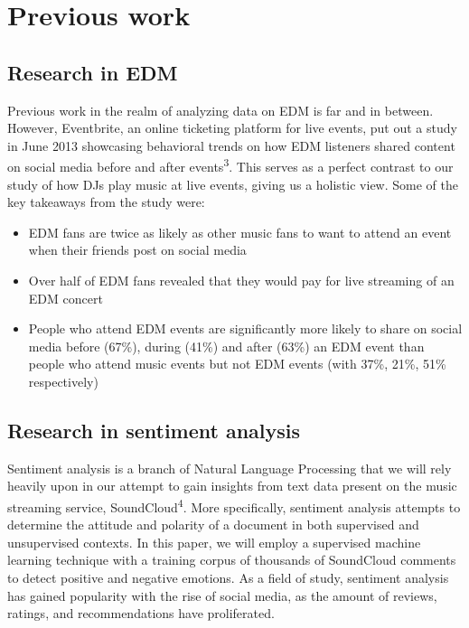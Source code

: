 \documentclass[12pt]{dalcsthesis}
\begin{document}
\chapter{Previous work}

\section{Research in EDM}

Previous work in the realm of analyzing data on EDM is far and in between. However, Eventbrite, an online ticketing platform for live events, put out a study in June 2013 showcasing behavioral trends on how EDM listeners shared content on social media before and after events\textsuperscript{3}. This serves as a perfect contrast to our study of how DJs play music at live events, giving us a holistic view. Some of the key takeaways from the study were:

\begin{itemize}
  \item EDM fans are twice as likely as other music fans to want to attend an event when their friends post on social media
  \item Over half of EDM fans revealed that they would pay for live streaming of an EDM concert
  \item People who attend EDM events are significantly more likely to share on social media before (67\%), during (41\%) and after (63\%) an EDM event than people who attend music events but not EDM events (with 37\%, 21\%, 51\% respectively)
\end{itemize}

\section{Research in sentiment analysis}
Sentiment analysis is a branch of Natural Language Processing that we will rely heavily upon in our attempt to gain insights from text data present on the music streaming service, SoundCloud\textsuperscript{4}. More specifically, sentiment analysis attempts to determine the attitude and polarity of a document in both supervised and unsupervised contexts. In this paper, we will employ a supervised machine learning technique with a training corpus of thousands of SoundCloud comments to detect positive and negative emotions. As a field of study, sentiment analysis has gained popularity with the rise of social media, as the amount of reviews, ratings, and recommendations have proliferated.
\end{document}
